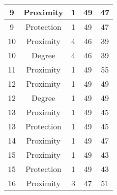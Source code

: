 \documentclass[results.tex]{subfiles}
\begin{document}
\begin{center}
\begin{tabular}{| c || c | c | c | c |}
            \hline
            9                       & Proximity                    & 1                      & 49                      & 47                   \\
            \hline
            9                       & Protection                   & 1                      & 49                      & 47                   \\
            \hline
            10                      & Proximity                    & 4                      & 46                      & 39                   \\
            \hline
            10                      & Degree                       & 4                      & 46                      & 39                   \\
            \hline
            11                      & Proximity                    & 1                      & 49                      & 55                   \\
            \hline
            12                      & Proximity                    & 1                      & 49                      & 49                   \\
            \hline
            12                      & Degree                       & 1                      & 49                      & 49                   \\
            \hline
            13                      & Proximity                    & 1                      & 49                      & 45                   \\
            \hline
            13                      & Protection                   & 1                      & 49                      & 45                   \\
            \hline
            14                      & Proximity                    & 1                      & 49                      & 47                   \\
            \hline
            15                      & Proximity                    & 1                      & 49                      & 43                   \\
            \hline
            15                      & Protection                   & 1                      & 49                      & 43                   \\
            \hline
            16                      & Proximity                    & 3                      & 47                      & 51                   \\

\end{tabular}
\end{center}
\end{document}
